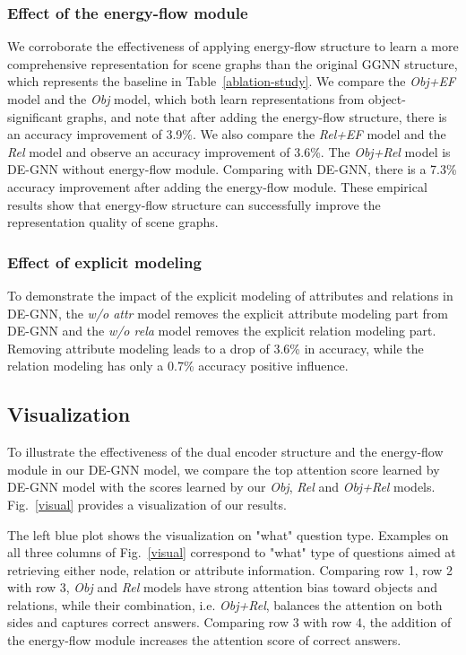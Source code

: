 \documentclass[letterpaper]{article} %
\begin{document}
\subsubsection{Effect of the energy-flow module} We corroborate the effectiveness of applying energy-flow structure to learn a more comprehensive representation for scene graphs than the original GGNN structure, which represents the baseline in Table~\ref{ablation-study}. 
We compare the \emph{Obj+EF} model and the \emph{Obj} model, which both learn representations from object-significant graphs, and note that after adding the energy-flow structure, there is an accuracy improvement of 3.9\%. 
We also compare the \emph{Rel+EF} model and the \emph{Rel} model and observe an accuracy improvement of 3.6\%. 
The \emph{Obj+Rel} model is DE-GNN without energy-flow module. 
Comparing with DE-GNN, there is a 7.3\% accuracy improvement after adding the energy-flow module. 
These empirical results show that energy-flow structure can successfully improve the representation quality of scene graphs. 

\subsubsection{Effect of explicit modeling} To demonstrate the impact of the explicit modeling of attributes and relations in DE-GNN, the \emph{w/o attr} model removes the explicit attribute modeling part from DE-GNN and the \emph{w/o rela} model removes the explicit relation modeling part. 
Removing attribute modeling leads to a drop of 3.6\% in accuracy, while the relation modeling has only a 0.7\% accuracy positive influence.



\subsection{Visualization}
To illustrate the effectiveness of the dual encoder structure and the energy-flow module in our DE-GNN model, we compare the top attention score learned by DE-GNN model with the scores learned by our \emph{Obj}, \emph{Rel} and \emph{Obj+Rel} models. 
Fig.~\ref{visual} provides a visualization of our results.

The left blue plot shows the visualization on "what" question type. 
Examples on all three columns of Fig.~\ref{visual} correspond to "what" type of questions aimed at retrieving either node, relation or attribute information. 
Comparing row 1, row 2 with row 3, \emph{Obj} and \emph{Rel} models have strong attention bias toward objects and relations, while their combination, i.e. \emph{Obj+Rel}, balances the attention on both sides and captures correct answers. 
Comparing row 3 with row 4, the addition of the energy-flow module increases the attention score of correct answers. 
\end{document}
